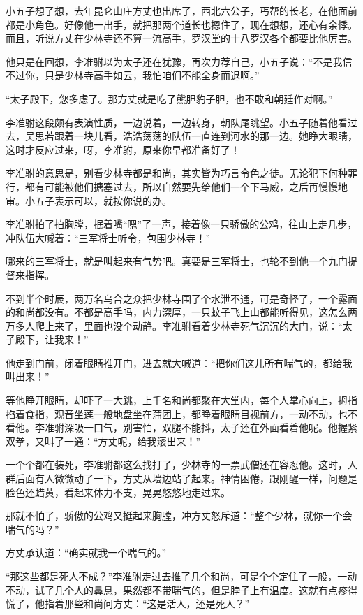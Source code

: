 小五子想了想，去年昆仑山庄方丈也出席了，西北六公子，丐帮的长老，在他面前都是小角色。好像他一出手，就把那两个道长也摁住了，现在想想，还心有余悸。而且，听说方丈在少林寺还不算一流高手，罗汉堂的十八罗汉各个都要比他厉害。

他只是在回想，李准驸以为太子还在犹豫，再次力荐自己，小五子说：“不是我信不过你，只是少林寺高手如云，我怕咱们不能全身而退啊。”

“太子殿下，您多虑了。那方丈就是吃了熊胆豹子胆，也不敢和朝廷作对啊。”

李准驸这段颇有表演性质，一边说着，一边转身，朝队尾眺望。小五子随着他看过去，吴思若跟着一块儿看，浩浩荡荡的队伍一直连到河水的那一边。她睁大眼睛，
这时才反应过来，呀，李准驸，原来你早都准备好了！

李准驸的意思是，别看少林寺都是和尚，其实皆为巧言令色之徒。无论犯下何种罪行，都有可能被他们搪塞过去，所以自然要先给他们一个下马威，之后再慢慢地审。小五子表示可以，就按你说的办。

李准驸拍了拍胸膛，抿着嘴“嗯”了一声，接着像一只骄傲的公鸡，往山上走几步，冲队伍大喊着：“三军将士听令，包围少林寺！”

哪来的三军将士，就是叫起来有气势吧。真要是三军将士，也轮不到他一个九门提督来指挥。

不到半个时辰，两万名乌合之众把少林寺围了个水泄不通，可是奇怪了，一个露面的和尚都没有。不都是高手吗，内力深厚，一只蚊子飞上山都能听得见，这怎么两万多人爬上来了，里面也没个动静。李准驸看着少林寺死气沉沉的大门，说：“太子殿下，让我来！”

他走到门前，闭着眼睛推开门，进去就大喊道：“把你们这儿所有喘气的，都给我叫出来！”

等他睁开眼睛，却吓了一大跳，上千名和尚都聚在大堂内，每个人掌心向上，拇指掐着食指，观音坐莲一般地盘坐在蒲团上，都睁着眼睛目视前方，一动不动，也不看他。李准驸深吸一口气，别害怕，双腿不能抖，太子还在外面看着他呢。他握紧双拳，又叫了一通：“方丈呢，给我滚出来！”

一个个都在装死，李准驸都这么找打了，少林寺的一票武僧还在容忍他。这时，人群后面有人微微动了一下，方丈从墙边站了起来。神情困倦，跟刚醒一样，问题是脸色还蜡黄，看起来体力不支，晃晃悠悠地走过来。

那就不怕了，骄傲的公鸡又挺起来胸膛，冲方丈怒斥道：“整个少林，就你一个会喘气的吗？”

方丈承认道：“确实就我一个喘气的。”

“那这些都是死人不成？”李准驸走过去推了几个和尚，可是个个定住了一般，一动不动，试了几个人的鼻息，果然都不带喘气的，但是脖子上有温度。这就有点疹得慌了，他指着那些和尚问方丈：“这是活人，还是死人？”

